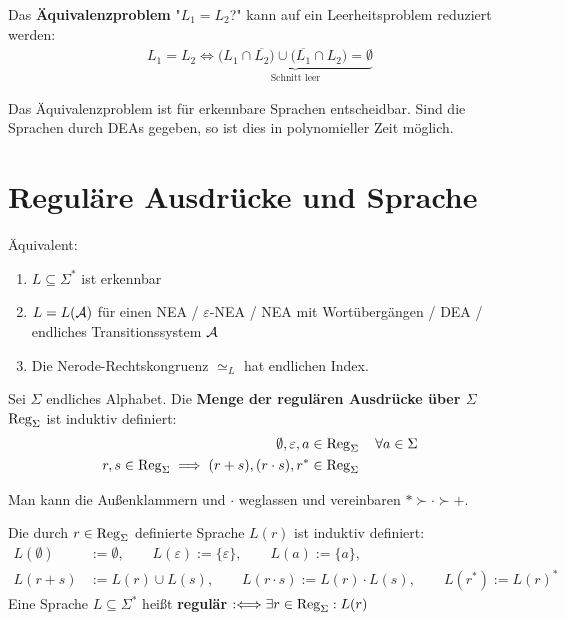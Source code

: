 Das \textbf{Äquivalenzproblem} "$L_1=L_2$?" kann auf ein Leerheitsproblem reduziert werden:
\begin{align*}
	L_1=L_2\Longleftrightarrow\underbrace{\big(L_1\cap\overline{L_2}\big)\cup\big(\overline{L_1}\cap L_2\big)=\emptyset}_{\text{Schnitt leer}}
\end{align*}

\begin{satz}\label{satz4.6}
	Das Äquivalenzproblem ist für erkennbare Sprachen entscheidbar.
	Sind die Sprachen durch DEAs gegeben, so ist dies in polynomieller Zeit möglich.
\end{satz}

\section{Reguläre Ausdrücke und Sprache}

\begin{korollar}
Äquivalent:
	\begin{enumerate}[label=\arabic*)]
		\item $L\subseteq\Sigma^\ast$ ist erkennbar
		\item $L=L(\mathcal{A})$ für einen NEA / $\varepsilon$-NEA / NEA mit Wortübergängen / DEA / endliches Transitionssystem $\mathcal{A}$
		\item Die Nerode-Rechtskongruenz $\simeq_L$ hat endlichen Index.
	\end{enumerate}
\end{korollar}

\begin{definition}\label{def5.1}
	Sei $\Sigma$ endliches Alphabet.
	Die \textbf{Menge der regulären Ausdrücke über $\Sigma$} $\operatorname{Reg}_\Sigma$ ist induktiv definiert:
	\begin{align*}
		\emptyset,\varepsilon,a&\in\operatorname{Reg}_\Sigma\quad\forall a\in\Sigma\\
		r,s\in\operatorname{Reg}_\Sigma\implies(r+s),(r\cdot s),r^\ast&\in\operatorname{Reg}_\Sigma
	\end{align*}
\end{definition}

Man kann die Außenklammern und $\cdot$ weglassen und vereinbaren $\ast\succ\cdot\succ +$.

\begin{definition}\label{def5.3}
	Die durch $r\in\operatorname{Reg}_\Sigma$ definierte Sprache $L(r)$ ist induktiv definiert:
	\begin{align*}
		L(\emptyset)&:=\emptyset,\qquad L(\varepsilon):=\lbrace\varepsilon\rbrace,\qquad L(a):=\lbrace a\rbrace,\\
		L(r+s)&:=L(r)\cup L(s),\qquad L(r\cdot s):=L(r)\cdot L(s),\qquad L(r^\ast):=L(r)^\ast
	\end{align*}
	Eine Sprache $L\subseteq\Sigma^\ast$ heißt \textbf{regulär} $:\Longleftrightarrow\exists r\in\operatorname{Reg}_\Sigma:L(r)$
\end{definition}

